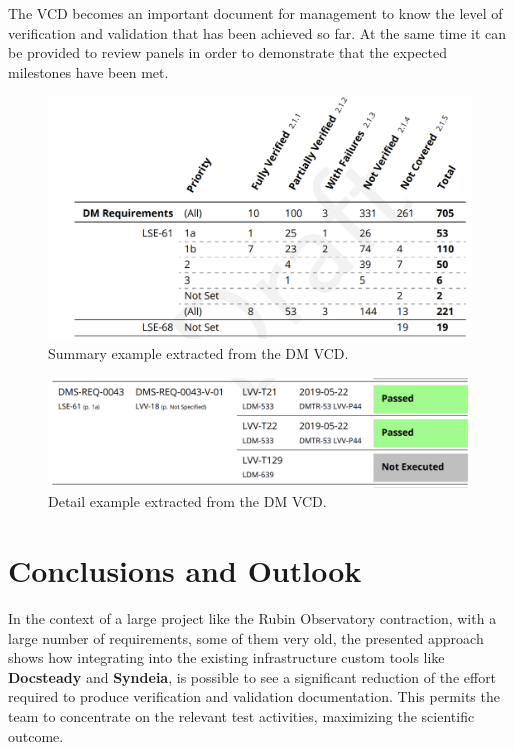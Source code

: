 The VCD becomes an important document for management to know the level of verification and validation that has been achieved so far.
At the same time it can be provided to review panels in order to demonstrate that the expected milestones have been met.

\begin{figure}
\begin{center}
\includegraphics[width=\textwidth]{imgs/VCDsumm.png}
 \caption{Summary example extracted from the DM VCD.}
 \label{fig:vcdsum}
\end{center}
\end{figure}

\begin{figure}
\begin{center}
\includegraphics[width=\textwidth]{imgs/VCDdetail.png}
 \caption{Detail example extracted from the DM VCD.}
 \label{fig:vcddetail}
\end{center}
\end{figure}

\section{Conclusions and Outlook}

In the context of a large project like the Rubin Observatory contraction, with a large number of requirements,
some of them very old, the presented approach shows how integrating into the existing infrastructure
custom tools like \textbf{Docsteady} and \textbf{Syndeia}, is possible to see a significant reduction of the effort
required to produce verification and validation documentation.
This permits the team to concentrate on the relevant test activities, maximizing the scientific outcome.

